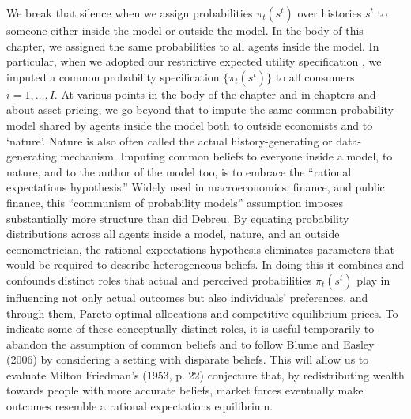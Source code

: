 %
We break that silence %
when we assign  probabilities $\pi_t(s^t)$ over histories $s^t$ to someone either inside the model or outside the model.
In the body of this chapter, we  assigned the same probabilities to all agents inside the model.  In particular, when we  adopted our restrictive expected utility specification , we
 imputed a common probability specification $\{\pi_t(s^t)\}$   to all consumers $i=1, \ldots, I$.
 At various points in the body of the  chapter and  in  chapters  and  about asset pricing,
 we   go beyond that to impute the same common probability model shared by agents inside the model  both to outside economists and to   `nature'. Nature is
 also often called  the
actual history-generating or data-generating mechanism.  Imputing common beliefs to everyone inside a model, to nature,
and to the author of the model too, is to embrace the  ``rational expectations hypothesis.''
%
%
Widely used in macroeconomics, finance, and public finance, this ``communism of probability models'' assumption imposes substantially more structure than did Debreu.
By equating probability distributions
 across all agents inside a model,  nature, and  an outside econometrician, the rational expectations hypothesis eliminates parameters that would
 be required to describe heterogeneous beliefs. In doing this it combines and confounds   distinct roles that actual and  perceived probabilities  $\pi_t(s^t)$ play in influencing not only actual outcomes but also   individuals'
preferences, and through them, Pareto optimal allocations and competitive equilibrium prices.
To indicate some of these conceptually distinct roles, it is useful temporarily to abandon the assumption of common beliefs and to follow
Blume and Easley (2006) by considering
a setting with disparate beliefs.  This will  allow us to evaluate  Milton Friedman's (1953, p. 22) conjecture
that, by redistributing wealth towards people with more accurate beliefs, market forces eventually make outcomes resemble
 a rational expectations equilibrium. %
%

